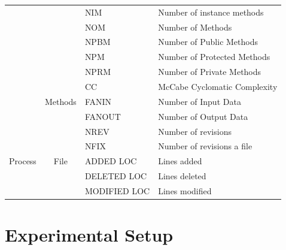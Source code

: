 \documentclass[sigconf,review]{acmart}
\theoremstyle{break}
\begin{document}
{\begin{table}[]
\begin{tabular}{|p{1cm}|c|l|p{3cm}|}
                                  &                                   & NIM         & Number of instance methods     \\ \cline{3-4} 
                                  &                                   & NOM         & Number of Methods              \\ \cline{3-4} 
                                  &                                   & NPBM        & Number of Public Methods       \\ \cline{3-4} 
                                  &                                   & NPM         & Number of Protected Methods    \\ \cline{3-4} 
                                  &                                   & NPRM        & Number of Private Methods      \\ \cline{2-4} 
                                  & \multirow{3}{*}{Methods}          & CC          & McCabe Cyclomatic Complexity   \\ \cline{3-4} 
                                  &                                   & FANIN       & Number of Input Data           \\ \cline{3-4} 
                                  &                                   & FANOUT      & Number of Output Data          \\ \hline
\multirow{5}{*}{Process }  & \multirow{5}{*}{File}             & NREV        & Number of revisions            \\ \cline{3-4} 
                                  &                                   & NFIX        & Number of revisions a file     \\ \cline{3-4} 
                                  &                                   & ADDED LOC    & Lines added                    \\ \cline{3-4} 
                                  &                                   & DELETED LOC  & Lines deleted                  \\ \cline{3-4} 
                                  &                                   & MODIFIED LOC & Lines modified                 \\ \hline
\end{tabular}
\end{table}
}


\section{Experimental Setup}
\label{sec:Experimental}
\end{document}
